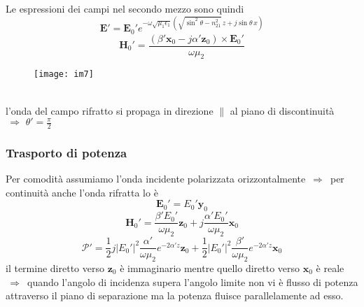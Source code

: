 \documentclass[a4paper]{article}
\begin{document}
Le espressioni dei campi nel secondo mezzo sono quindi
\begin{equation*}
\textbf{E}'=\textbf{E}_0'e^{-\omega\sqrt{\mu_1\epsilon_1}\left(\sqrt{\sin^2\theta-n_{21}^2}\,z+j\sin\theta\,x\right)}
\end{equation*}
\begin{equation*}
\textbf{H}_0'=\frac{(\beta'\textbf{x}_0-j\alpha'\textbf{z}_0)\times\textbf{E}_0'}{\omega\mu_2}
\end{equation*}
\begin{figure}[ht] 
\centering
\texttt{[image: im7]}
\end{figure}
\\l'onda del campo rifratto si propaga in direzione $\parallel$ al piano di discontinuità $\,\Rightarrow\,\,\theta'=\frac{\pi}{2}$
\subsubsection*{Trasporto di potenza}
Per comodità assumiamo l'onda incidente polarizzata orizzontalmente $\,\Rightarrow\,$ per continuità anche l'onda rifratta lo è
\begin{equation*}
\textbf{E}_0'=E_0'\textbf{y}_0
\end{equation*}
\begin{equation*}
\textbf{H}_0'=\frac{\beta'E_0'}{\omega\mu_2}\textbf{z}_0+j\frac{\alpha'E_0'}{\omega\mu_2}\textbf{x}_0
\end{equation*}
\begin{equation*}
\bm{\mathcal{P}'}=\frac{1}{2}j|E_0'|^2\frac{\alpha'}{\omega\mu_2}e^{-2\alpha'z}\textbf{z}_0+\frac{1}{2}|E_0'|^2\frac{\beta'}{\omega\mu_2}e^{-2\alpha'z}\textbf{x}_0
\end{equation*}
il termine diretto verso $\textbf{z}_0$ è immaginario mentre quello diretto verso $\textbf{x}_0$ è reale $\,\Rightarrow\,$ quando l'angolo di incidenza supera l'angolo limite non vi è flusso di potenza attraverso il piano di separazione ma la potenza fluisce parallelamente ad esso.
\end{document}
